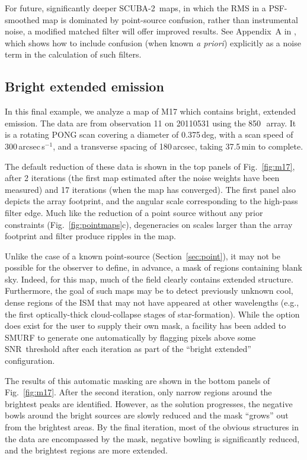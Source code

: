 \documentclass[useAMS,usenatbib,nofootinbib]{mn2e}
\newcommand{\snr}{SNR}
\newcommand{\scuba}{SCUBA-2}
\begin{document}
For future, significantly deeper \scuba\ maps, in which the RMS in a
PSF-smoothed map is dominated by point-source confusion, rather than
instrumental noise, a modified matched filter will offer improved
results. See Appendix~A in \citet{chapin2011}, which shows how to
include confusion (when known \emph{a priori}) explicitly as a noise
term in the calculation of such filters.

\subsection{Bright extended emission}
\label{sec:extended}

In this final example, we analyze a map of M17 which contains bright,
extended emission. The data are from observation 11 on 20110531 using
the 850\,\micron\ array. It is a rotating PONG scan covering a
diameter of 0.375\,deg, with a scan speed of 300\,arcsec\,s$^{-1}$,
and a transverse spacing of 180\,arcsec, taking 37.5\,min to complete.

The default reduction of these data is shown in the top panels of
Fig.~\ref{fig:m17}, after 2 iterations (the first map estimated after
the noise weights have been measured) and 17 iterations (when the map
has converged). The first panel also depicts the array footprint, and
the angular scale corresponding to the high-pass filter edge. Much
like the reduction of a point source without any prior constraints
(Fig.~\ref{fig:pointmaps}c), degeneracies on scales larger than the
array footprint and filter produce ripples in the map.

Unlike the case of a known point-source (Section~\ref{sec:point}), it
may not be possible for the observer to define, in advance, a mask of
regions containing blank sky. Indeed, for this map, much of the field
clearly contains extended structure. Furthermore, the goal of such
maps may be to detect previously unknown cool, dense regions of the
ISM that may not have appeared at other wavelengths (e.g., the first
optically-thick cloud-collapse stages of star-formation). While the
option does exist for the user to supply their own mask, a facility
has been added to SMURF to generate one automatically by flagging
pixels above some \snr\ threshold after each iteration as part of the
``bright extended'' configuration.

The results of this automatic masking are shown in the bottom panels
of Fig.~\ref{fig:m17}. After the second iteration, only narrow regions
around the brightest peaks are identified. However, as the solution
progresses, the negative bowls around the bright sources are slowly
reduced and the mask ``grows'' out from the brightest areas. By the
final iteration, most of the obvious structures in the data are
encompassed by the mask, negative bowling is significantly reduced,
and the brightest regions are more extended.
\end{document}
